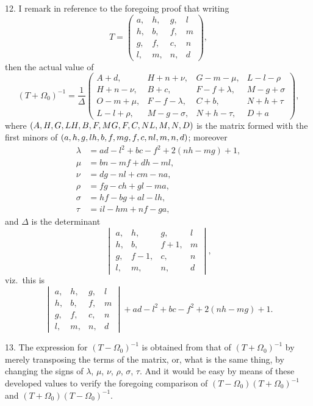 \documentclass[11pt,a4paper]{article}
\theoremstyle{plain}
\begin{document}
12. I remark in reference to the foregoing proof that writing
\[
T =
\begin{pmatrix}
a, & h, & g, & l \\
h, & b, & f, & m \\
g, & f, & c, & n \\
l, & m, & n, & d
\end{pmatrix},
\]
then the actual value of
\[
(T + \Omega_0)^{-1} =
\frac{1}{\Delta}
\begin{pmatrix}
A+d, & H+n+\nu, & G-m-\mu, & L-l-\rho \\
H+n-\nu, & B+c, & F-f+\lambda, & M-g+\sigma \\
O-m+\mu, & F-f-\lambda, & C+b, & N+h+\tau \\
L-l+\rho, & M-g-\sigma, & N+h-\tau, & D+a
\end{pmatrix},
\]
where $(A,H,G,L \\ H,B,F,M \\ G,F,C,N \\ L,M,N,D)$ is the matrix formed with the first minors of $(a,h,g,l \\ h,b,f,m \\ g,f,c,n \\ l,m,n,d)$; moreover
\begin{align*}
\lambda &= ad - l^2 + bc - f^2 + 2(nh - mg) + 1, \\
\mu &= bn - mf + dh - ml, \\
\nu &= dg - nl + cm - na, \\
\rho &= fg - ch + gl - ma, \\
\sigma &= hf - bg + al - lh, \\
\tau &= il - hm + nf - ga,
\end{align*}
and $\Delta$ is the determinant
\[
\begin{vmatrix}
a, & h, & g, & l \\
h, & b, & f+1, & m \\
g, & f-1, & c, & n \\
l, & m, & n, & d
\end{vmatrix},
\]
viz.\ this is
\[
\begin{vmatrix}
a, & h, & g, & l \\
h, & b, & f, & m \\
g, & f, & c, & n \\
l, & m, & n, & d
\end{vmatrix}
+ ad - l^2 + bc - f^2 + 2(nh - mg) + 1.
\]

13. The expression for $(T - \Omega_0)^{-1}$ is obtained from that of $(T + \Omega_0)^{-1}$ by merely transposing the terms of the matrix, or, what is the same thing, by changing the signs of $\lambda$, $\mu$, $\nu$, $\rho$, $\sigma$, $\tau$. And it would be easy by means of these developed values to verify the foregoing comparison of $(T - \Omega_0)(T + \Omega_0)^{-1}$ and $(T + \Omega_0)(T - \Omega_0)^{-1}$.
\end{document}

